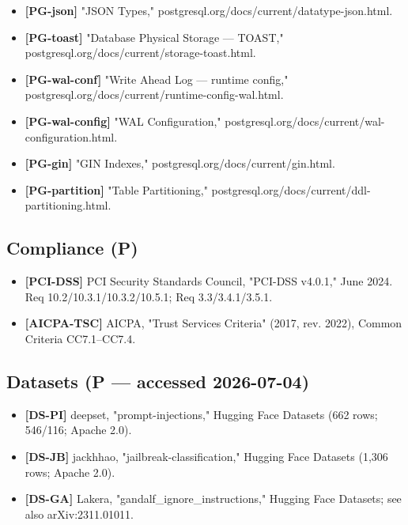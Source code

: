 \begin{itemize}
\tightlist
\item
  \textbf{{[}PG-json{]}} "JSON Types,"
  postgresql.org/docs/current/datatype-json.html.
\item
  \textbf{{[}PG-toast{]}} "Database Physical Storage --- TOAST,"
  postgresql.org/docs/current/storage-toast.html.
\item
  \textbf{{[}PG-wal-conf{]}} "Write Ahead Log --- runtime config,"
  postgresql.org/docs/current/runtime-config-wal.html.
\item
  \textbf{{[}PG-wal-config{]}} "WAL Configuration,"
  postgresql.org/docs/current/wal-configuration.html.
\item
  \textbf{{[}PG-gin{]}} "GIN Indexes,"
  postgresql.org/docs/current/gin.html.
\item
  \textbf{{[}PG-partition{]}} "Table Partitioning,"
  postgresql.org/docs/current/ddl-partitioning.html.
\end{itemize}

\subsection{Compliance (P)}\label{compliance-p}

\begin{itemize}
\tightlist
\item
  \textbf{{[}PCI-DSS{]}} PCI Security Standards Council, "PCI-DSS
  v4.0.1," June 2024. Req 10.2/10.3.1/10.3.2/10.5.1; Req
  3.3/3.4.1/3.5.1.
\item
  \textbf{{[}AICPA-TSC{]}} AICPA, "Trust Services Criteria" (2017, rev.
  2022), Common Criteria CC7.1--CC7.4.
\end{itemize}

\subsection{Datasets (P --- accessed
2026-07-04)}\label{datasets-p--accessed-2026-07-04}

\begin{itemize}
\tightlist
\item
  \textbf{{[}DS-PI{]}} deepset, "prompt-injections," Hugging Face
  Datasets (662 rows; 546/116; Apache 2.0).
\item
  \textbf{{[}DS-JB{]}} jackhhao, "jailbreak-classification," Hugging
  Face Datasets (1,306 rows; Apache 2.0).
\item
  \textbf{{[}DS-GA{]}} Lakera, "gandalf\_ignore\_instructions," Hugging
  Face Datasets; see also arXiv:2311.01011.
\end{itemize}

